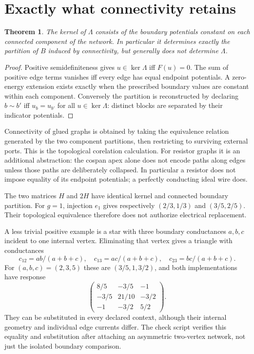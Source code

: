 \documentclass[11pt]{article}
\newtheorem{theorem}{Theorem}\newtheorem{proposition}[theorem]{Proposition}
\begin{document}
\section{Exactly what connectivity retains}
\begin{theorem}
The kernel of $\Lambda$ consists of the boundary potentials constant on each connected component of the network. In particular it determines exactly the partition of $B$ induced by connectivity, but generally does not determine $\Lambda$.
\end{theorem}
\begin{proof}
Positive semidefiniteness gives $u\in\ker\Lambda$ iff $F(u)=0$. The sum of positive edge terms vanishes iff every edge has equal endpoint potentials. A zero-energy extension exists exactly when the prescribed boundary values are constant within each component. Conversely the partition is reconstructed by declaring $b\sim b'$ iff $u_b=u_{b'}$ for all $u\in\ker\Lambda$: distinct blocks are separated by their indicator potentials.
\end{proof}
Connectivity of glued graphs is obtained by taking the equivalence relation generated by the two component partitions, then restricting to surviving external ports. This is the topological corelation calculation. For resistor graphs it is an additional abstraction: the cospan apex alone does not encode paths along edges unless those paths are deliberately collapsed. In particular a resistor does not impose equality of its endpoint potentials; a perfectly conducting ideal wire does.

The two matrices $H$ and $2H$ have identical kernel and connected boundary partition. For $g=1$, injection $e_1$ gives respectively $(2/3,1/3)$ and $(3/5,2/5)$. Their topological equivalence therefore does not authorize electrical replacement.

A less trivial positive example is a star with three boundary conductances $a,b,c$ incident to one internal vertex. Eliminating that vertex gives a triangle with conductances
\[c_{12}=ab/(a+b+c),\quad c_{13}=ac/(a+b+c),\quad c_{23}=bc/(a+b+c).\]
For $(a,b,c)=(2,3,5)$ these are $(3/5,1,3/2)$, and both implementations have response
\[\begin{pmatrix}8/5&-3/5&-1\\-3/5&21/10&-3/2\\-1&-3/2&5/2\end{pmatrix}.\]
They can be substituted in every declared context, although their internal geometry and individual edge currents differ. The check script verifies this equality and substitution after attaching an asymmetric two-vertex network, not just the isolated boundary comparison.
\end{document}
